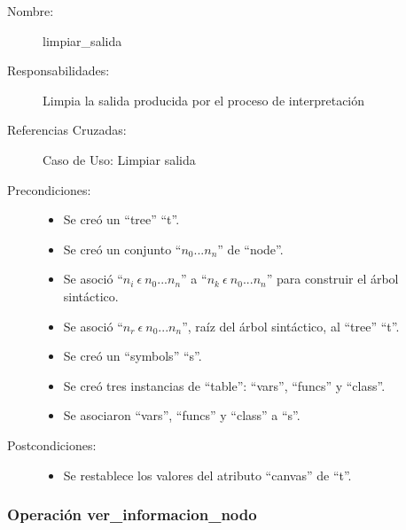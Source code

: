 	\begin{description}
		\item [Nombre:] limpiar\_salida
		\item [Responsabilidades:] Limpia la salida producida por el proceso de interpretación
		\item [Referencias Cruzadas: ] Caso de Uso: Limpiar salida
      \item [Precondiciones:] \hfill
         \begin {itemize}
         \item Se creó un ``tree'' ``t''.
         \item Se creó un conjunto ``$n_0...n_n$'' de ``node''.
         \item Se asoció ``$n_i\ \epsilon\ n_0...n_n$'' a ``$n_k\ \epsilon\ n_0...n_n$'' para construir el árbol sintáctico.
         \item Se asoció  ``$n_r\ \epsilon\ n_0...n_n$'', raíz del árbol sintáctico, al ``tree'' ``t''.
         \item Se creó un ``symbols'' ``s''.
         \item Se creó tres instancias de ``table'': ``vars'', ``funcs'' y ``class''.
         \item Se asociaron ``vars'', ``funcs'' y ``class'' a ``s''.
      \end{itemize}
      \item [Postcondiciones:] \hfill
      \begin {itemize}
         \item Se restablece los valores del atributo ``canvas'' de ``t''.
      \end{itemize}
	\end{description} 


\subsubsection{Operación ver\_informacion\_nodo}

